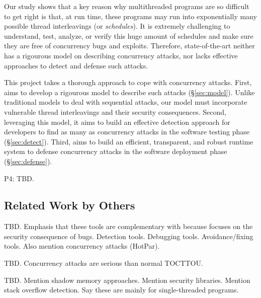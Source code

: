 Our study shows that a key reason why multithreaded programs are so difficult 
to get right is that, at run time, these programs may run into 
exponentially many possible thread interleavings (or \emph{schedules}). It is 
extremely challenging to understand, test, analyze, or verify this huge amount 
of schedules and make sure they are free of concurrency bugs and exploits. 
Therefore, state-of-the-art neither has a rigourous model on describing 
concurrency attacks, nor lacks effective approaches to detect and defense such 
attacks.

This \xxx project takes a thorough approach to cope with concurrency attacks.
First, \xxx aims to develop a rigourous model to describe such attacks 
(\S\ref{sec:model}). Unlike traditional models to deal with sequential attacks, 
our model must incorporate vulnerable thread interleavings and their security 
consequences. Second, leveraging this model, it aims to build an effective 
detection approach for developers to find as many as concurrency attacks in the 
software testing phase (\S\ref{sec:detect}). Third, \xxx aims to build an 
efficient, transparent, and robust runtime system to defense concurrency attacks 
in the software deployment phase (\S\ref{sec:defense}).

P4: TBD.


\subsection{Related Work by Others} \label{sec:others-work}

 TBD. Emphasis that these tools are 
complementary with \xxx because \xxx focuses on the security consequence of 
bugs.
Detection tools.
Debugging tools.
Avoidance/fixing tools.
Also mention concurrency attacks (HotPar).

 TBD. Concurrency attacks are serious than normal 
TOCTTOU.

 TBD.
Mention shadow memory approaches.
Mention security libraries.
Mention stack overflow detection.
Say these are mainly for single-threaded programs.


